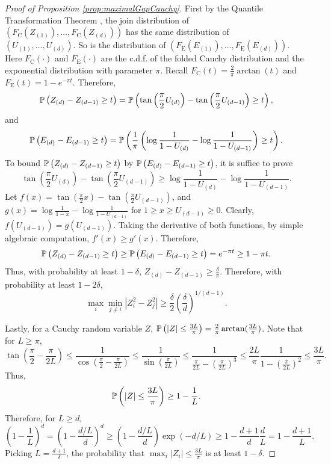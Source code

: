 \begin{proof}[Proof of Proposition \ref{prop:maximalGapCauchy}]
	First by the Quantile Transformation Theorem \citep{dasgupta2011finite}, the join distribution of $(F_{\text{C}}(Z_{(1)}), \ldots, F_{\text{C}}(Z_{(d)}))$ has the same distribution of \\ $(U_{(1)}, \ldots, U_{(d)})$. So is the distribution of $(F_{\text{E}}(E_{(1)}), \ldots, F_{\text{E}}(E_{(d)}))$. 
	Here $F_{\text{C}}(\cdot)$ and $F_{\text{E}}(\cdot)$ are the c.d.f. of the folded Cauchy distribution and the exponential distribution with parameter $\pi$. 
	Recall $F_{\text{C}}(t) = \frac{2}{\pi}\arctan(t)$ and $F_{\text{E}}(t) = 1-e^{-\pi t}$. 
	Therefore,
	\[
	\mathbb{P}\left( Z_{(d)} - Z_{(d-1)} \ge t\right) = \mathbb{P}\left(\tan\left(\frac{\pi}{2}U_{(d)} \right) - \tan\left(\frac{\pi}{2}U_{(d-1)}\right) \ge t \right),
	\]
	and 
	\[
	\mathbb{P}\left(E_{(d)} - E_{(d-1)} \ge t\right) = \mathbb{P}\left(\frac{1}{\pi} \left( \log \frac{1}{1-U_{(d)}} - \log \frac{1}{1-U_{(d-1)}} \right) \ge t\right).
	\]
	To bound $\mathbb{P}\left( Z_{(d)} - Z_{(d-1)} \ge t\right)$ by $\mathbb{P}\left(E_{(d)} - E_{(d-1)} \ge t\right)$, it is suffice to prove 
	\[
	\tan\left(\frac{\pi}{2}U_{(d)} \right) - \tan\left(\frac{\pi}{2}U_{(d-1)}\right) \ge \log \frac{1}{1-U_{(d)}} - \log \frac{1}{1-U_{(d-1)}} .
	\] 
	Let $f(x) = \tan\left(\frac{\pi}{2}x \right) - \tan\left(\frac{\pi}{2}U_{(d-1)}\right)$, and $g(x) = \log \frac{1}{1-x} - \log \frac{1}{1-U_{(d-1)}}$ for $1\ge x\ge U_{(d-1)}\ge 0 $.
	Clearly, $f(U_{(d-1)}) = g(U_{(d-1)})$. Taking the derivative of both functions, by simple algebraic computation, $f'(x) \ge g'(x)$.
	Therefore,
	\[
	\mathbb{P}\left( Z_{(d)} - Z_{(d-1)} \ge t\right) \ge \mathbb{P}\left(E_{(d)} - E_{(d-1)} \ge t\right) = e^{-\pi t} \ge 1-\pi t.
	\]
	Thus, with probability at least $1-\delta$, $Z_{(d)} - Z_{(d-1)} \ge \frac{\delta}{\pi}$.
	Therefore, with probability at least $1-2\delta$,
	\[
	\max_i \min_{j\neq i} |Z_i^2 - Z_j^2| \ge  \frac{\delta}{2}\left(\frac{\delta}{d}\right)^{1/(d-1)}.
	\]
	
	Lastly, for a Cauchy random variable $Z$, $\mathbb{P}\left(|Z|\le \frac{3L}{\pi}\right)  = \frac{2}{\pi}\arctan(\frac{3L}{\pi})$.
	Note that for $L\ge \pi$,
	\[
	\tan(\frac{\pi}{2} - \frac{\pi}{2L}) \le \frac{1}{\cos (\frac{\pi}{2} - \frac{\pi}{2L})} \le \frac{1}{\sin(\frac{\pi}{2L})}\le \frac{1}{\frac{\pi}{2L} - \left( \frac{\pi}{2L}\right)^3}\le \frac{2L}{\pi} \frac{1}{1 - \left(\frac{\pi}{2L}\right)^2} \le \frac{3L}{\pi}.
	\]
	Thus, 
	\[
	\mathbb{P}\left(|Z|\le \frac{3L}{\pi}\right)  \ge 1 - \frac{1}{L}.
	\]
	Therefore, for $L\ge d$,
	\[
	\left(1-\frac{1}{L}\right)^d  = \left(1- \frac{d/L}{d}\right)^d \ge  \left(1- \frac{d/L}{d}\right) \exp(-d/L) \ge 1- \frac{d+1}{d}\frac{d}{L}=1-\frac{d+1}{L}.
	\]
	Picking $L = \frac{d+1}{\delta}$, the probability that $\max_i |Z_i| \le \frac{3L}{\pi}$ is at least $1-\delta$.
\end{proof}

